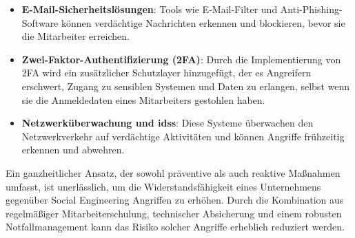 \begin{itemize}
    \item \textbf{E-Mail-Sicherheitslösungen}: Tools wie E-Mail-Filter und Anti-Phishing-Software können verdächtige Nachrichten erkennen und blockieren, bevor sie die Mitarbeiter erreichen.
    \item \textbf{Zwei-Faktor-Authentifizierung (2FA)}: Durch die Implementierung von 2FA wird ein zusätzlicher Schutzlayer hinzugefügt, der es Angreifern erschwert, Zugang zu sensiblen Systemen und Daten zu erlangen, selbst wenn sie die Anmeldedaten eines Mitarbeiters gestohlen haben.
    \item \textbf{Netzwerküberwachung und \glspl{ids}}: Diese Systeme überwachen den Netzwerkverkehr auf verdächtige Aktivitäten und können Angriffe frühzeitig erkennen und abwehren.
\end{itemize}

Ein ganzheitlicher Ansatz, der sowohl präventive als auch reaktive Maßnahmen umfasst, ist unerlässlich, um die Widerstandsfähigkeit eines Unternehmens gegenüber Social Engineering Angriffen zu erhöhen.
Durch die Kombination aus regelmäßiger Mitarbeiterschulung, technischer Absicherung und einem robusten Notfallmanagement kann das Risiko solcher Angriffe erheblich reduziert werden.\cite{social-engineering-a-survey, bsi-social-engineering}
